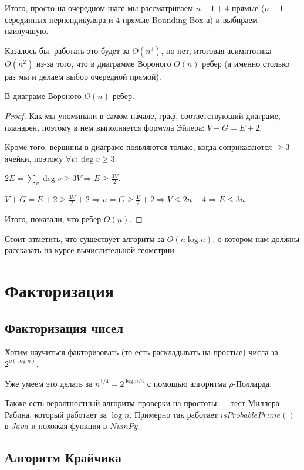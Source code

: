 Итого, просто на очередном шаге мы рассматриваем $n-1+4$ прямые ($n-1$ серединных перпендикуляра и $4$ прямые Bounding Box-а) и выбираем наилучшую.

Казалось бы, работать это будет за $O(n^3)$, но нет, итоговая асимптотика $O(n^2)$ из-за того, что в диаграмме Вороного $O(n)$ ребер
(а именно столько раз мы и делаем выбор очередной прямой).

\begin{lemma}
	В диаграме Вороного $O(n)$ ребер.
\end{lemma}

\begin{proof}
	Как мы упоминали в самом начале, граф, соответствующий диаграме, планарен, поэтому в нем выполняется формула Эйлера: $V+G=E+2$.

	Кроме того, вершины в диаграме появляются только, когда соприкасаются $\geqslant 3$ ячейки, поэтому $\forall v: \deg v \geqslant 3$.

	$2E = \sum\limits_v \deg v \geqslant 3V \Rightarrow E \geqslant \frac{3V}{2}$.

	$V + G = E + 2 \geqslant \frac{3V}{2} + 2 \Rightarrow n = G \geqslant \frac{V}{2} + 2 \Rightarrow V \leqslant 2n - 4 \Rightarrow E \leqslant 3n$.

	Итого, показали, что ребер $O(n)$.
\end{proof}

Стоит отметить, что существует алгоритм за $O(n \log n)$, о котором нам должны рассказать на курсе вычислительной геометрии.

\section{Факторизация}

\subsection{Факторизация чисел}

Хотим научиться факторизовать (то есть раскладывать на простые) числа за $2^{o(\log n)}$.

Уже умеем это делать за $n^{1/4} = 2^{\log n / 4}$ с помощью алгоритма $\rho$-Полларда.

Также есть вероятностный алгоритм проверки на простоты --- тест Миллера-Рабина, который работает за $\log n$.
Примерно так работает $isProbablePrime()$ в $Java$ и похожая функция в $NumPy$.

\subsection{Алгоритм Крайчика}

